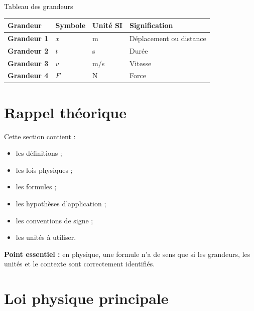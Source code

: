 \documentclass[11pt,a4paper]{article}
\begin{document}
\begin{cadregris}{Tableau des grandeurs}
\renewcommand{\arraystretch}{1.35}
\begin{tabularx}{\textwidth}{>{\bfseries}p{3cm}p{2.5cm}p{2.5cm}X}
\toprule
Grandeur & Symbole & Unité SI & Signification \\
\midrule
Grandeur 1 & $x$ & m & Déplacement ou distance \\
Grandeur 2 & $t$ & s & Durée \\
Grandeur 3 & $v$ & m/s & Vitesse \\
Grandeur 4 & $F$ & N & Force \\
\bottomrule
\end{tabularx}
\end{cadregris}

\section{Rappel théorique}

\begin{cadretheorie}
Cette section contient :
\begin{itemize}
    \item les définitions ;
    \item les lois physiques ;
    \item les formules ;
    \item les hypothèses d’application ;
    \item les conventions de signe ;
    \item les unités à utiliser.
\end{itemize}

\medskip

\textbf{Point essentiel :} en physique, une formule n’a de sens que si les grandeurs, les unités et le contexte sont correctement identifiés.
\end{cadretheorie}

\section{Loi physique principale}
\end{document}
